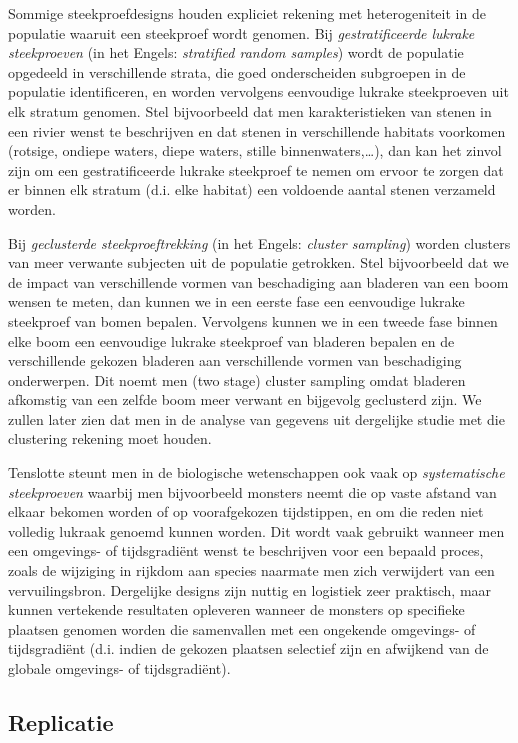 \documentclass[12pt,dutch,coursenotes]{book}
\theoremstyle{definition}
\theoremstyle{definition}
\theoremstyle{definition}
\theoremstyle{remark}
\begin{document}
Sommige steekproefdesigns houden expliciet rekening met heterogeniteit
in de populatie waaruit een steekproef wordt genomen. Bij
\emph{gestratificeerde lukrake steekproeven} (in het Engels:
\emph{stratified random samples}) wordt de populatie opgedeeld in
verschillende strata, die goed onderscheiden subgroepen in de populatie
identificeren, en worden vervolgens eenvoudige lukrake steekproeven uit
elk stratum genomen. Stel bijvoorbeeld dat men karakteristieken van
stenen in een rivier wenst te beschrijven en dat stenen in verschillende
habitats voorkomen (rotsige, ondiepe waters, diepe waters, stille
binnenwaters,\ldots{}), dan kan het zinvol zijn om een gestratificeerde
lukrake steekproef te nemen om ervoor te zorgen dat er binnen elk
stratum (d.i. elke habitat) een voldoende aantal stenen verzameld
worden.

Bij \emph{geclusterde steekproeftrekking} (in het Engels: \emph{cluster
sampling}) worden clusters van meer verwante subjecten uit de populatie
getrokken. Stel bijvoorbeeld dat we de impact van verschillende vormen
van beschadiging aan bladeren van een boom wensen te meten, dan kunnen
we in een eerste fase een eenvoudige lukrake steekproef van bomen
bepalen. Vervolgens kunnen we in een tweede fase binnen elke boom een
eenvoudige lukrake steekproef van bladeren bepalen en de verschillende
gekozen bladeren aan verschillende vormen van beschadiging onderwerpen.
Dit noemt men (two stage) cluster sampling omdat bladeren afkomstig van
een zelfde boom meer verwant en bijgevolg geclusterd zijn. We zullen
later zien dat men in de analyse van gegevens uit dergelijke studie met
die clustering rekening moet houden.

Tenslotte steunt men in de biologische wetenschappen ook vaak op
\emph{systematische steekproeven} waarbij men bijvoorbeeld monsters
neemt die op vaste afstand van elkaar bekomen worden of op voorafgekozen
tijdstippen, en om die reden niet volledig lukraak genoemd kunnen
worden. Dit wordt vaak gebruikt wanneer men een omgevings- of
tijdsgradiënt wenst te beschrijven voor een bepaald proces, zoals de
wijziging in rijkdom aan species naarmate men zich verwijdert van een
vervuilingsbron. Dergelijke designs zijn nuttig en logistiek zeer
praktisch, maar kunnen vertekende resultaten opleveren wanneer de
monsters op specifieke plaatsen genomen worden die samenvallen met een
ongekende omgevings- of tijdsgradiënt (d.i. indien de gekozen plaatsen
selectief zijn en afwijkend van de globale omgevings- of tijdsgradiënt).

\subsection{Replicatie}\label{replicatie}
\end{document}
